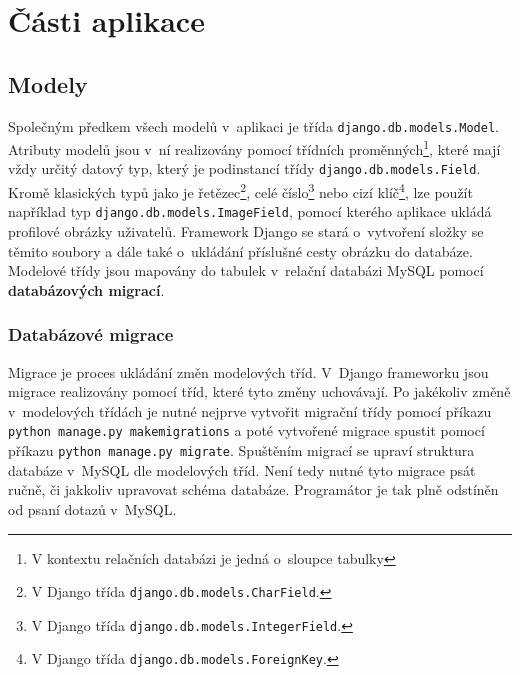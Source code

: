 \section{Části aplikace}

\subsection{Modely}
\begin{sloppypar}
Společným předkem všech modelů v~aplikaci je třída \texttt{django.db.models.Model}. Atributy modelů jsou v~ní realizovány pomocí třídních proměnných\footnote{V kontextu relačních databázi je jedná o~sloupce tabulky}, které mají vždy určitý datový typ, který je podinstancí třídy \texttt{django.db.models.Field}. Kromě klasických typů jako je řetězec\footnote{V Django třída \texttt{django.db.models.CharField}.}, celé číslo\footnote{V Django třída \texttt{django.db.models.IntegerField}.} nebo cizí klíč\footnote{V Django třída \texttt{django.db.models.ForeignKey}.}, lze použít například typ \texttt{django.db.models.ImageField}, pomocí kterého aplikace ukládá profilové obrázky uživatelů. Framework Django se stará o~vytvoření složky se těmito soubory a dále také o~ukládání příslušné cesty obrázku do databáze. Modelové třídy jsou mapovány do tabulek v~relační databázi MySQL pomocí \textbf{databázových migrací}.
\end{sloppypar}

\subsubsection{Databázové migrace}
Migrace je proces ukládání změn modelových tříd. V~Django frameworku jsou migrace realizovány pomocí tříd, které tyto změny uchovávají. Po jakékoliv změně v~modelových třídách je nutné nejprve vytvořit migrační třídy pomocí příkazu \mbox{\texttt{python manage.py makemigrations}} a poté vytvořené migrace spustit pomocí příkazu \mbox{\texttt{python manage.py migrate}}. Spuštěním migrací se upraví struktura databáze v~MySQL dle modelových tříd. Není tedy nutné tyto migrace psát ručně, či jakkoliv upravovat schéma databáze. Programátor je tak plně odstíněn od psaní dotazů v~MySQL.

